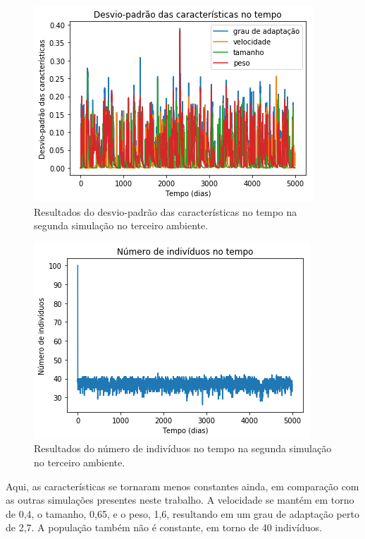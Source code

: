 \documentclass[10pt,brazil,english]{article}
\begin{document}
            \begin{figure}[!hbtp]
                \begin{center}
                    \includegraphics[scale=0.5]{Images/3-5.png}
                \end{center}
                \caption{Resultados do desvio-padrão das características no tempo na segunda simulação no terceiro ambiente.}
                \label{Fig17}
            \end{figure} 
            
            \begin{figure}[!hbtp]
                \begin{center}
                    \includegraphics[scale=0.5]{Images/3-6.png}
                \end{center}
                \caption{Resultados do número de indivíduos no tempo na segunda simulação no terceiro ambiente.}
                \label{Fig18}
            \end{figure}
            
            Aqui, as características se tornaram menos constantes ainda, em comparação com as outras simulações presentes neste trabalho. A velocidade se mantém em torno de 0,4, o tamanho, 0,65, e o peso, 1,6, resultando em um grau de adaptação perto de 2,7. A população também não é constante, em torno de 40 indivíduos.
            
\end{document}
